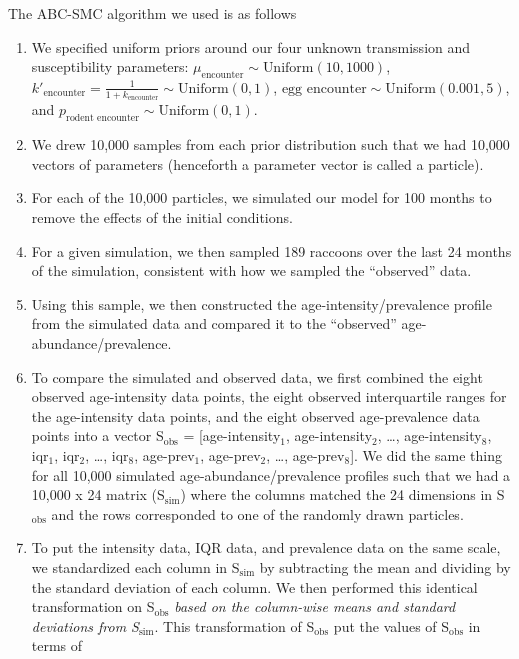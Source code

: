 \documentclass[11pt]{article}
\begin{document}
The ABC-SMC algorithm we used is as follows \citep{Toni2009,Sisson2009,Beaumont2010}

\begin{enumerate}
\def\labelenumi{\arabic{enumi}.}
\item
  We specified uniform priors around our four unknown transmission and
  susceptibility parameters: $\mu_{\text{encounter}} \sim \text{Uniform}(10, 1000)$, $k'_{\text{encounter}} = \frac{1}{1 + k_{\text{encounter}}} \sim \text{Uniform}(0, 1)$, $\text{egg encounter} \sim \text{Uniform}(0.001, 5)$, and $p_{\text{rodent encounter}} \sim \text{Uniform}(0, 1)$.
\item
  We drew 10,000 samples from each prior distribution such that we had
  10,000 vectors of parameters (henceforth a parameter vector is called a particle).
\item
  For each of the 10,000 particles, we simulated our model for 100
  months to remove the effects of the initial conditions.
\item
  For a given simulation, we then sampled 189 raccoons over the last 24
  months of the simulation, consistent with how we sampled the ``observed'' data.
\item
  Using this sample, we then constructed the age-intensity/prevalence
  profile from the simulated data and compared it to the ``observed'' age-
  abundance/prevalence.
\item
  To compare the simulated and observed data, we first combined the
  eight observed age-intensity data points, the eight observed interquartile ranges for the age-intensity data points, and the eight observed
  age-prevalence data points into a vector S$_\text{obs}$ = [age-intensity$_1$,
  age-intensity$_2$, \ldots{}, age-intensity$_8$, iqr$_1$, iqr$_2$, \ldots{}, iqr$_8$, age-prev$_1$,
  age-prev$_2$, \ldots{}, age-prev$_8$]. We did the same thing for all
  10,000 simulated age-abundance/prevalence profiles such that we had a
  10,000 x 24 matrix (S$_\text{sim}$) where the columns matched the 24 dimensions
  in S$_\text{obs}$ and the rows corresponded to one of the randomly drawn
  particles.
\item
  To put the intensity data, IQR data, and prevalence data on the same
  scale, we standardized each column in S$_\text{sim}$ by subtracting the mean
  and dividing by the standard deviation of each column. We then
  performed this identical transformation on S$_\text{obs}$ \emph{based on the
  column-wise means and standard deviations from S$_\text{sim}$}. This
  transformation of S$_\text{obs}$ put the values of S$_\text{obs}$ in terms of

\end{enumerate}
\end{document}
